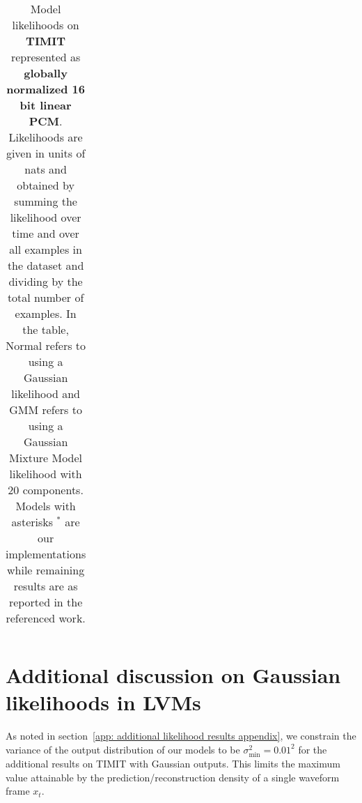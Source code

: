 \begin{table}[t!]
\begin{tabular}{lll|r}
        \bottomrule
    \end{tabular}
    \caption{
    Model likelihoods on \textbf{TIMIT} represented as \textbf{globally normalized 16 bit linear PCM}. Likelihoods are given in units of nats and obtained by summing the likelihood over time and over all examples in the dataset and dividing by the total number of examples. In the table, Normal refers to using a Gaussian likelihood and GMM refers to using a  Gaussian Mixture Model likelihood with 20 components. Models with asterisks $^*$ are our implementations while remaining results are as reported in the referenced work.
    }
    \label{tab: timit likelihoods gaussian appendix}
\end{table}


\section{Additional discussion on Gaussian likelihoods in LVMs} \label{app: gaussian likelihood unboundedness discussion}
As noted in section~\cref{app: additional likelihood results appendix}, we constrain the variance of the output distribution of our models to be $\sigma^2_\text{min} = 0.01^2$ for the additional results on TIMIT with Gaussian outputs. This limits the maximum value attainable by the prediction/reconstruction density of a single waveform frame $x_t$. 

